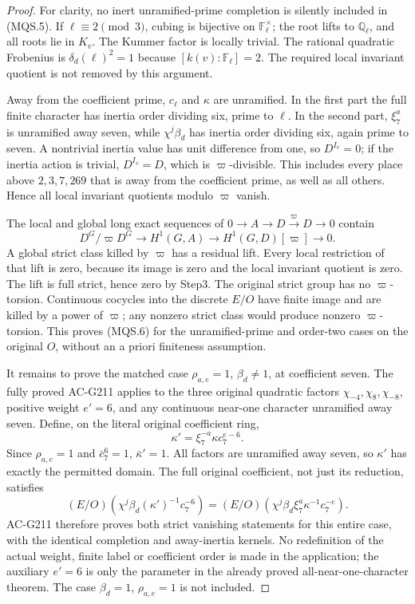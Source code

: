 \begin{proof}
For clarity, no inert unramified-prime completion is
silently included in (MQS.5).  If $\ell\equiv2\pmod3$,
cubing is bijective on $\mathbb F_\ell^\times$; the root
lifts to $\mathbb Q_\ell$, and all roots lie in $K_v$.
The Kummer factor is locally trivial.  The rational
quadratic Frobenius is $\delta_d(\ell)^2=1$ because
$[k(v):\mathbb F_\ell]=2$.  The required local invariant
quotient is not removed by this argument.

Away from the coefficient prime, $c_\ell$ and $\kappa$
are unramified.  In the first part the full finite
character has inertia order dividing six, prime to
$\ell$.  In the second part, $\xi_7^a$ is unramified
away seven, while $\chi^j\beta_d$ has inertia order
dividing six, again prime to seven.
A nontrivial inertia value has unit difference from
one, so $D^{I_v}=0$; if the inertia action is trivial,
$D^{I_v}=D$, which is $\varpi$-divisible.
This includes every place above $2,3,7,269$ that is
away from the coefficient prime, as well as all others.
Hence all local invariant quotients modulo $\varpi$ vanish.

The local and global long exact sequences of
$0\to A\to D\xrightarrow{\varpi}D\to0$ contain
\[
 D^G/\varpi D^G\longrightarrow H^1(G,A)
          \longrightarrow H^1(G,D)[\varpi]\longrightarrow0.
 \tag{MQS.18}
\]
A global strict class killed by $\varpi$ has a residual
lift.  Every local restriction of that lift is zero,
because its image is zero and the local invariant
quotient is zero.  The lift is full strict, hence zero
by Step3.  The original strict group has no
$\varpi$-torsion.  Continuous cocycles into the discrete
$E/O$ have finite image and are killed by a power of
$\varpi$; any nonzero strict class would produce
nonzero $\varpi$-torsion.  This proves (MQS.6) for the
unramified-prime and order-two cases on the original $O$,
without an a priori finiteness assumption.

It remains to prove the matched case $\rho_{a,e}=1$,
$\beta_d\ne1$, at coefficient seven.  The fully proved
AC-G211 applies to the three original quadratic factors
$\chi_{-4},\chi_8,\chi_{-8}$, positive weight $e'=6$,
and any continuous near-one character unramified away seven.
Define, on the literal original coefficient ring,
\[
                \kappa'=\xi_7^{-a}\kappa c_7^{e-6}.
 \tag{MQS.19}
\]
Since $\rho_{a,e}=1$ and $\bar c_7^6=1$,
$\bar\kappa'=1$.  All factors are unramified away seven,
so $\kappa'$ has exactly the permitted domain.  The full
original coefficient, not just its reduction, satisfies
\[
 (E/O)(\chi^j\beta_d(\kappa')^{-1}c_7^{-6})
          =(E/O)(\chi^j\beta_d\xi_7^a\kappa^{-1}c_7^{-e}).
 \tag{MQS.20}
\]
AC-G211 therefore proves both strict vanishing statements
for this entire case, with the identical completion and
away-inertia kernels.  No redefinition of the actual
weight, finite label or coefficient order is made in the
application; the auxiliary $e'=6$ is only the parameter
in the already proved all-near-one-character theorem.
The case $\beta_d=1$, $\rho_{a,e}=1$ is not included.


\end{proof}
